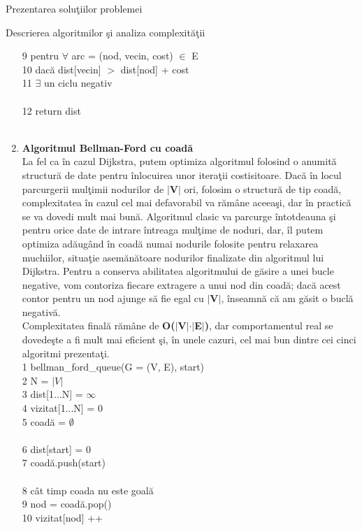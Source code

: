 \documentclass[a4paper]{article}
\begin{document}
\begin{section}{Prezentarea solu\c tiilor problemei\\}
\begin{subsection}{Descrierea algoritmilor \c si analiza complexit\u a\c tii\\}
\begin{enumerate}
	9  \quad\quad\quad pentru $\forall$ arc = (nod, vecin, cost) $\in$ E \\
	10 \quad\quad\quad\quad\quad dac\u a dist[vecin] $>$ dist[nod] + cost \\
	11 \quad\quad\quad\quad\quad\quad\quad  $\exists$ un ciclu negativ \\ \\
	12 \quad\quad\quad return dist \\ \\

	\item \textbf{Algoritmul Bellman-Ford cu coad\u a} \\[0.4cm]
	La fel ca \^ in cazul Dijkstra, putem optimiza algoritmul folosind o anumit\u a structur\u a de date pentru \^ inlocuirea unor itera\c tii costisitoare. Dac\u a \^ in locul parcurgerii mul\c timii nodurilor de \textbf{$|$V$|$} ori, folosim o structur\u a de tip coad\u a, complexitatea \^ in cazul cel mai defavorabil va r\u am\^ ane aceea\c si, dar \^ in practic\u a se va dovedi mult mai bun\u a. Algoritmul clasic va parcurge \^ intotdeauna \c si pentru orice date de intrare \^ intreaga mul\c time de noduri, dar, \^ il putem optimiza ad\u aug\^ and \^ in coad\u a numai nodurile folosite pentru relaxarea muchiilor, situa\c tie asem\u an\u atoare nodurilor finalizate din algoritmul lui Dijkstra. Pentru a conserva abilitatea algoritmului de g\u asire a unei bucle negative, vom contoriza fiecare extragere a unui nod din coad\u a; dac\u a acest contor pentru un nod ajunge s\u a fie egal cu \textbf{$|$V$|$}, \^ inseamn\u a c\u a am g\u asit o bucl\u a negativ\u a. \\
Complexitatea final\u a r\u am\^ ane de \textbf{O($|$V$|$$\cdot$$|$E$|$)}, dar comportamentul real se dovede\c ste a fi mult mai eficient\cite{china} \c si, \^ in unele cazuri, cel mai bun dintre cei cinci algoritmi prezenta\c ti.
\\

	1 \quad bellman\_ford\_queue(G = (V, E), start) \\
	2 \quad\quad\quad N = $|V|$ \\
	3 \quad\quad\quad dist[1...N] = $\infty$ \\
	4 \quad\quad\quad vizitat[1...N] = 0 \\
	5 \quad\quad\quad coad\u a = $\emptyset$ \\ \\
	6 \quad\quad\quad dist[start] = 0 \\ 
	7 \quad\quad\quad coad\u a.push(start) \\\\
	8 \quad\quad\quad c\^ at timp coada nu este goal\u a \\
	9  \quad\quad\quad\quad\quad nod = coad\u a.pop() \\
	10  \quad\quad\quad\quad\quad vizitat[nod] ++ \\


\end{enumerate}
\end{subsection}
\end{section}
\end{document}
